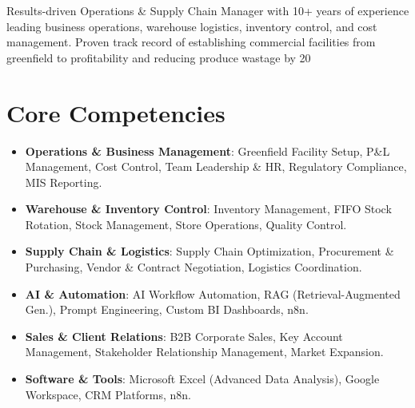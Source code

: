 \documentclass[11pt,a4paper,sans]{moderncv}
\begin{document}
\makecvtitle


\vspace{6pt}
\small{Results-driven Operations & Supply Chain Manager with 10+ years of experience leading business operations, warehouse logistics, inventory control, and cost management. Proven track record of establishing commercial facilities from greenfield to profitability and reducing produce wastage by 20%


\section{Core Competencies}
\vspace{1pt}
\begin{itemize}

\item \textbf{Operations \& Business Management}: Greenfield Facility Setup, P&L Management, Cost Control, Team Leadership \& HR, Regulatory Compliance, MIS Reporting.

\item \textbf{Warehouse \& Inventory Control}: Inventory Management, FIFO Stock Rotation, Stock Management, Store Operations, Quality Control.

\item \textbf{Supply Chain \& Logistics}: Supply Chain Optimization, Procurement & Purchasing, Vendor & Contract Negotiation, Logistics Coordination.

\item \textbf{AI \& Automation}: AI Workflow Automation, RAG (Retrieval-Augmented Gen.), Prompt Engineering, Custom BI Dashboards, n8n.

\item \textbf{Sales \& Client Relations}: B2B Corporate Sales, Key Account Management, Stakeholder Relationship Management, Market Expansion.

\item \textbf{Software \& Tools}: Microsoft Excel (Advanced Data Analysis), Google Workspace, CRM Platforms, n8n.


\end{itemize}}
\end{document}

